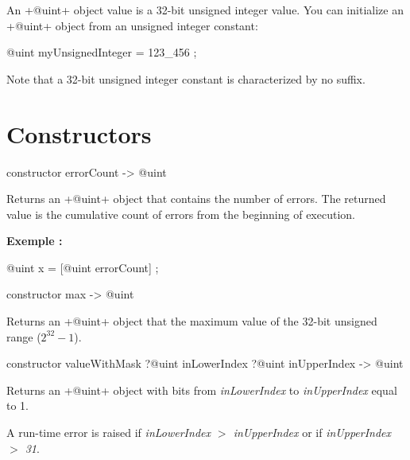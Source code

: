

An \ggs+@uint+ object value is a 32-bit unsigned integer value. You can initialize an \ggs+@uint+ object from an unsigned integer constant:\\

\begin{galgas}
@uint myUnsignedInteger = 123_456 ;
\end{galgas}

Note that a 32-bit unsigned integer constant is characterized by no suffix.

\section{Constructors}


\begin{galgas}
constructor errorCount -> @uint
\end{galgas}


Returns an \ggs+@uint+ object that contains the number of errors. The returned value is the cumulative count of errors from the beginning of execution.

\textbf{Exemple :}
\begin{galgas}
@uint x = [@uint errorCount] ;
\end{galgas}





\begin{galgas}
constructor max -> @uint
\end{galgas}

Returns an \ggs+@uint+ object that the maximum value of the 32-bit unsigned range ($2^{32}-1$).



\begin{galgas}
constructor valueWithMask ?@uint inLowerIndex ?@uint inUpperIndex -> @uint
\end{galgas}


Returns an \ggs+@uint+ object with bits from \emph{inLowerIndex} to \emph{inUpperIndex} equal to 1.

A run-time error is raised if \emph{inLowerIndex $>$ inUpperIndex} or if \emph{inUpperIndex $>$ 31}.



